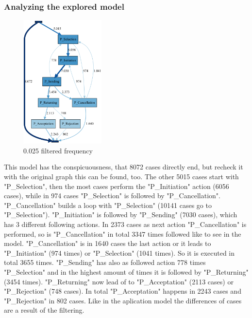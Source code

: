 \subsubsection{Analyzing the explored model}
\begin{figure}
  \begin{center}
    \includegraphics[width = 0.38\textwidth]{P_DirectlyFollowedFreq0-025End.PNG}
  \end{center}
  \caption{0.025 filtered frequency}
\end{figure}

This model has the conspicuousness, that 8072 cases directly end, but recheck it with the original graph this can be found, too. The other 5015 cases start with "P\_Selection", then the most cases perform the "P\_Initiation" action (6056 cases), while in 974 cases "P\_Selection" is followed by "P\_Cancellation". "P\_Cancellation" builds a loop with "P\_Selection" (10141 cases go to "P\_Selection"). "P\_Initiation" is followed by "P\_Sending" (7030 cases), which has 3 different following actions. In 2373 cases as next action "P\_Cancellation" is performed, so is "P\_Cancellation" in total 3347 times followed like to see in the model. "P\_Cancellation" is in 1640 cases the last action or it leads to "P\_Initiation" (974 times) or "P\_Selection" (1041 times). So it is executed in total 3655 times. "P\_Sending" has also as followed action 778 times "P\_Selection" and in the highest amount of times it is followed by "P\_Returning" (3454 times). "P\_Returning" now lead of to "P\_Acceptation" (2113 cases) or "P\_Rejection" (748 cases). In total "P\_Acceptation" happens in 2243 cases and "P\_Rejection" in 802 cases. Like in the aplication model the differences of cases are a result of the filtering. 


